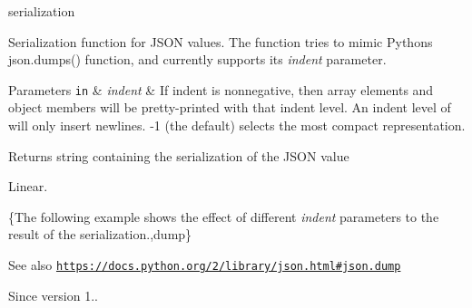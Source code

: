 serialization 

Serialization function for J\+S\+ON values. The function tries to mimic Python\textquotesingle{}s {\ttfamily json.\+dumps()} function, and currently supports its {\itshape indent} parameter.


\begin{DoxyParams}[1]{Parameters}
\mbox{\tt in}  & {\em indent} & If indent is nonnegative, then array elements and object members will be pretty-\/printed with that indent level. An indent level of {} will only insert newlines. {\ttfamily -\/1} (the default) selects the most compact representation.\\
\hline
\end{DoxyParams}
\begin{DoxyReturn}{Returns}
string containing the serialization of the J\+S\+ON value
\end{DoxyReturn}
Linear.

\{The following example shows the effect of different {\itshape indent} parameters to the result of the serialization.,dump\}

\begin{DoxySeeAlso}{See also}
\href{https://docs.python.org/2/library/json.html#json.dump}{\tt https\+://docs.\+python.\+org/2/library/json.\+html\#json.\+dump}
\end{DoxySeeAlso}
\begin{DoxySince}{Since}
version 1.. 
\end{DoxySince}
\hypertarget{classnlohmann_1_1basic__json_a7ca7e132c3641f440fea36892fc694cf}{}\label{classnlohmann_1_1basic__json_a7ca7e132c3641f440fea36892fc694cf} 
